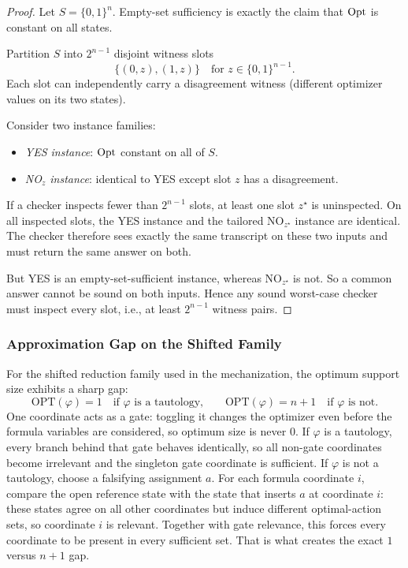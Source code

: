 \begin{proof}
Let $S=\{0,1\}^n$. Empty-set sufficiency is exactly the claim that $\mathrm{Opt}$ is constant on all states.

Partition $S$ into $2^{n-1}$ disjoint witness slots
\[
\{(0,z),(1,z)\}\quad\text{for }z\in\{0,1\}^{n-1}.
\]
Each slot can independently carry a disagreement witness (different optimizer values on its two states).

Consider two instance families:
\begin{itemize}
\item \emph{YES instance}: $\mathrm{Opt}$ constant on all of $S$.
\item \emph{NO$_z$ instance}: identical to YES except slot $z$ has a disagreement.
\end{itemize}

If a checker inspects fewer than $2^{n-1}$ slots, at least one slot $z^\star$ is uninspected. On all inspected slots, the YES instance and the tailored NO$_{z^\star}$ instance are identical. The checker therefore sees exactly the same transcript on these two inputs and must return the same answer on both.

But YES is an empty-set-sufficient instance, whereas NO$_{z^\star}$ is not. So a common answer cannot be sound on both inputs. Hence any sound worst-case checker must inspect every slot, i.e., at least $2^{n-1}$ witness pairs.
\end{proof}

\subsubsection{Approximation Gap on the Shifted Family}

For the shifted reduction family used in the mechanization, the optimum support size exhibits a sharp gap:
\[
\mathrm{OPT}(\varphi)=1 \quad \text{if $\varphi$ is a tautology,}
\qquad
\mathrm{OPT}(\varphi)=n+1 \quad \text{if $\varphi$ is not.}
\]
One coordinate acts as a gate: toggling it changes the optimizer even before the formula variables are considered, so optimum size is never $0$. If $\varphi$ is a tautology, every branch behind that gate behaves identically, so all non-gate coordinates become irrelevant and the singleton gate coordinate is sufficient. If $\varphi$ is not a tautology, choose a falsifying assignment $a$. For each formula coordinate $i$, compare the open reference state with the state that inserts $a$ at coordinate $i$: these states agree on all other coordinates but induce different optimal-action sets, so coordinate $i$ is relevant. Together with gate relevance, this forces every coordinate to be present in every sufficient set. That is what creates the exact $1$ versus $n+1$ gap.

